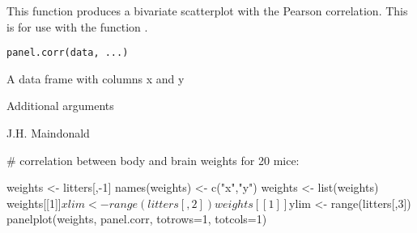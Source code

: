\begin{Description}\relax
This function produces a bivariate scatterplot with the Pearson 
correlation.  This is for use with the function .
\end{Description}
\begin{Usage}
\begin{verbatim}
panel.corr(data, ...)
\end{verbatim}
\end{Usage}
\begin{Arguments}
\begin{ldescription}
\item[\code{data}] A data frame with columns x and y
\item[\code{...}] Additional arguments
\end{ldescription}
\end{Arguments}
\begin{Author}\relax
J.H. Maindonald
\end{Author}
\begin{Examples}
\begin{ExampleCode}

# correlation between body and brain weights for 20 mice:

weights <- litters[,-1]
names(weights) <-  c("x","y")
weights <- list(weights)
weights[[1]]$xlim <- range(litters[,2])
weights[[1]]$ylim <- range(litters[,3])
panelplot(weights, panel.corr, totrows=1, totcols=1)
\end{ExampleCode}
\end{Examples}

